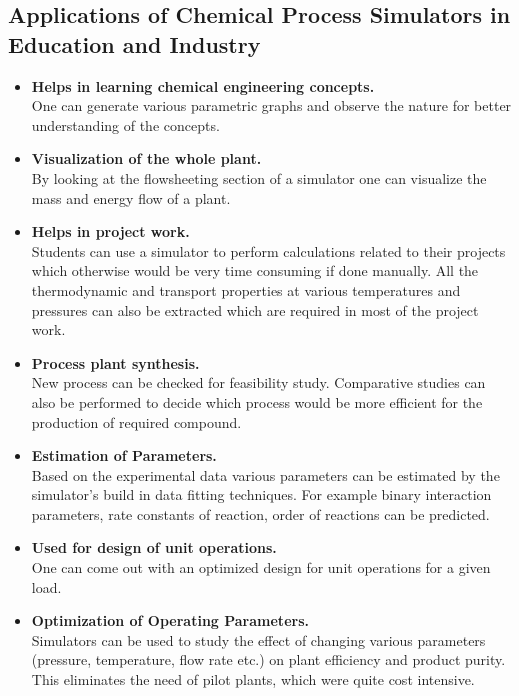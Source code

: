 \documentclass[12pt]{report}
\begin{document}
\subsection{Applications of Chemical Process Simulators in Education and Industry}
\begin{itemize}
\item{\textbf{Helps in learning chemical engineering concepts.}} \\
One can generate various parametric graphs and observe the nature for better understanding of the concepts.

\item{\textbf{Visualization of the whole plant.}} \\
By looking at the flowsheeting section of a simulator one can visualize the mass and energy flow of a plant.

\item{\textbf{Helps in project work.}} \\
Students can use a simulator to perform calculations related to their projects which otherwise would be very time consuming if done manually. All the thermodynamic and transport properties at various temperatures and pressures can also be extracted which are required in most of the project work.

\item{\textbf{Process plant synthesis.}} \\
New process can be checked for feasibility study. Comparative studies can also be performed to decide which process would be more efficient for the production of required compound.

\item{\textbf{Estimation of Parameters.}} \\
Based on the experimental data various parameters can be estimated by the simulator's build in data fitting techniques. For example binary interaction parameters, rate constants of reaction, order of reactions can be predicted.

\item{\textbf{Used for design of unit operations.}} \\
One can come out with an optimized design for unit operations for a given load.

\item{\textbf{Optimization of Operating Parameters.}} \\
Simulators can be used to study the effect of changing various parameters (pressure, temperature, flow rate etc.) on plant efficiency and product purity. This eliminates the need of pilot plants, which were quite cost intensive.


\end{itemize}
\end{document}
